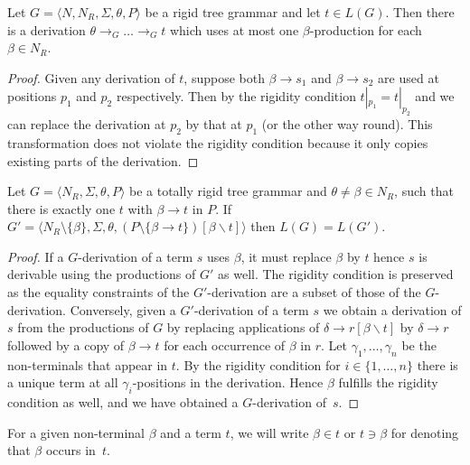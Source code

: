 \documentclass{LMCS}
\theoremstyle{plain}
\theoremstyle{definition}
\def\set#1{\{#1\}}
\def\tuple#1{\langle#1\rangle}
\newcommand{\sop}{[}
\newcommand{\scl}{]}
\newcommand{\sel}[2]{#1 \backslash #2}
\newcommand{\unsubst}[2]{\sop \sel{#1}{#2} \scl}
\newcommand{\Lang}[1]{L(#1)}	\newcommand{\Gram}[1]{\mathrm{G}(#1)}	\newcommand{\Gramreg}[1]{\mathrm{G}_0(#1)}
\newcommand{\derel}[1]{\mathbin{\rightarrow_{#1}}}
\begin{document}
\begin{lem}\label{lem.rigid_projection}
Let $G=\tuple{N,N_R,\Sigma,\theta,P}$ be a rigid tree grammar and let
$t\in\Lang{G}$. Then there is a derivation
$\theta\derel{G}\ldots\derel{G}t$ which uses at most one
$\beta$-production for each $\beta\in N_R$.
\end{lem}

\begin{proof}
Given any derivation of $t$, suppose
both $\beta\rightarrow s_1$ and $\beta\rightarrow s_2$ are
used at positions $p_1$ and $p_2$ respectively. Then by the rigidity
condition $t|_{p_1} = t|_{p_2}$ and we can replace the derivation at
$p_2$ by that at $p_1$ (or the other way round). This transformation
does not violate the rigidity condition because it only copies
existing parts of the derivation.
\end{proof}


\begin{lem}\label{lem.elim_rigid_NT}
Let $G=\tuple{N_R,\Sigma,\theta,P}$ be a totally rigid tree grammar and
$\theta\neq \beta \in N_R$, such that there is exactly one $t$ with
$\beta\rightarrow t$ in $P$. If
$G'=\tuple{N_R\setminus\set{\beta},\Sigma,\theta,
  (P\setminus\set{\beta\to t})\unsubst{\beta}{t}}$ then
$\Lang{G}=\Lang{G'}$.
\end{lem}
\begin{proof}
If a $G$-derivation of a term $s$ uses $\beta$, it must replace
$\beta$ by $t$ hence $s$ is derivable using the productions of $G'$ as
well. The rigidity condition is preserved as the equality constraints
of the $G'$-derivation are a subset of those of the $G$-derivation.
Conversely, given a $G'$-derivation of a term $s$ we obtain a
derivation of $s$ from the productions of $G$ by replacing
applications of $\delta\to r\unsubst{\beta}{t}$ by $\delta\to r$
followed by a copy of $\beta\to t$ for each occurrence of $\beta$ in
$r$. Let $\gamma_1,\ldots,\gamma_n$ be the non-terminals that appear
in $t$. By the rigidity condition for $i\in\{ 1,\ldots,n \}$ there is
a unique term at all $\gamma_i$-positions in the derivation. Hence
$\beta$ fulfills the rigidity condition as well, and we have obtained a
$G$-derivation of~$s$.
\end{proof}




\begin{nota}
For a given non-terminal $\beta$ and a term $t$, we will write
$\beta\in t$ or $t\ni\beta$ for denoting that $\beta$ occurs in~$t$.
\end{nota}
\end{document}
